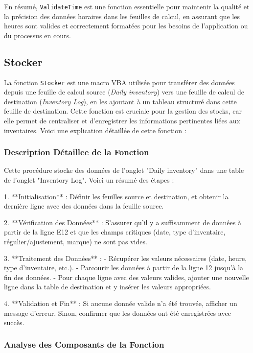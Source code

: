 \documentclass[a4paper, oneside, 12pt, final]{extreport}
\begin{document}
En résumé, \texttt{ValidateTime} est une fonction essentielle pour maintenir la qualité et la précision des données horaires dans les feuilles de calcul, en assurant que les heures sont valides et correctement formatées pour les besoins de l'application ou du processus en cours.
\subsection{Stocker}

La fonction \texttt{Stocker} est une macro VBA utilisée pour transférer des données depuis une feuille de calcul source (\textit{Daily inventory}) vers une feuille de calcul de destination (\textit{Inventory Log}), en les ajoutant à un tableau structuré dans cette feuille de destination. Cette fonction est cruciale pour la gestion des stocks, car elle permet de centraliser et d'enregistrer les informations pertinentes liées aux inventaires. Voici une explication détaillée de cette fonction :

\subsubsection{Description Détaillee de la Fonction}
Cette procédure stocke des données de l'onglet "Daily inventory" dans une table de l'onglet "Inventory Log". Voici un résumé des étapes :

1. **Initialisation** : Définir les feuilles source et destination, et obtenir la dernière ligne avec des données dans la feuille source.

2. **Vérification des Données** : S'assurer qu'il y a suffisamment de données à partir de la ligne E12 et que les champs critiques (date, type d'inventaire, régulier/ajustement, marque) ne sont pas vides.

3. **Traitement des Données** :
   - Récupérer les valeurs nécessaires (date, heure, type d'inventaire, etc.).
   - Parcourir les données à partir de la ligne 12 jusqu'à la fin des données.
   - Pour chaque ligne avec des valeurs valides, ajouter une nouvelle ligne dans la table de destination et y insérer les valeurs appropriées.

4. **Validation et Fin** : Si aucune donnée valide n'a été trouvée, afficher un message d'erreur. Sinon, confirmer que les données ont été enregistrées avec succès.

\subsubsection{Analyse des Composants de la Fonction}
\end{document}
